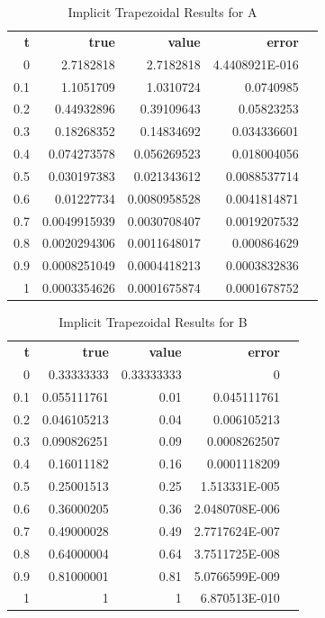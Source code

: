 \documentclass{article}
\begin{document}
\begin{table}[H]
\footnotesize
\centering
\caption{Implicit Trapezoidal Results for A}
\label{tab:a_implcit}
\begin{tabular}{rrrrl}
\textbf{t} & \textbf{true} & \textbf{value} & \textbf{error} &  \\
0          & 2.7182818     & 2.7182818      & 4.4408921E-016 &  \\
0.1        & 1.1051709     & 1.0310724      & 0.0740985      &  \\
0.2        & 0.44932896    & 0.39109643     & 0.05823253     &  \\
0.3        & 0.18268352    & 0.14834692     & 0.034336601    &  \\
0.4        & 0.074273578   & 0.056269523    & 0.018004056    &  \\
0.5        & 0.030197383   & 0.021343612    & 0.0088537714   &  \\
0.6        & 0.01227734    & 0.0080958528   & 0.0041814871   &  \\
0.7        & 0.0049915939  & 0.0030708407   & 0.0019207532   &  \\
0.8        & 0.0020294306  & 0.0011648017   & 0.000864629    &  \\
0.9        & 0.0008251049  & 0.0004418213   & 0.0003832836   &  \\
1          & 0.0003354626  & 0.0001675874   & 0.0001678752   
\end{tabular}
\end{table}


\begin{table}[H]
\footnotesize
\centering
\caption{Implicit Trapezoidal Results for B}
\label{tab:b_implcit}
\begin{tabular}{rrrrl}
\textbf{t} & \textbf{true} & \textbf{value} & \textbf{error} &  \\
0          & 0.33333333    & 0.33333333     & 0              &  \\
0.1        & 0.055111761   & 0.01           & 0.045111761    &  \\
0.2        & 0.046105213   & 0.04           & 0.006105213    &  \\
0.3        & 0.090826251   & 0.09           & 0.0008262507   &  \\
0.4        & 0.16011182    & 0.16           & 0.0001118209   &  \\
0.5        & 0.25001513    & 0.25           & 1.513331E-005  &  \\
0.6        & 0.36000205    & 0.36           & 2.0480708E-006 &  \\
0.7        & 0.49000028    & 0.49           & 2.7717624E-007 &  \\
0.8        & 0.64000004    & 0.64           & 3.7511725E-008 &  \\
0.9        & 0.81000001    & 0.81           & 5.0766599E-009 &  \\
1          & 1             & 1              & 6.870513E-010  & 
\end{tabular}
\end{table}
\end{document}
